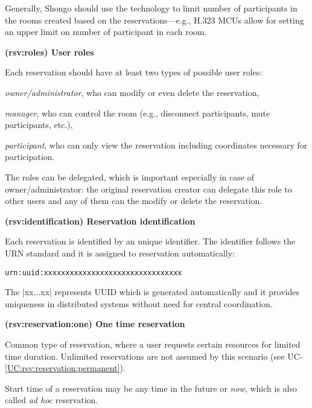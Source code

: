 \documentclass[a4paper]{report}
\makeatletter
\newcounter{UCcounter}
\newenvironment{UseCases}%
	{\begin{list}{\textbf{UC-\arabic{UCcounter}}}{\@nmbrlisttrue\def\@listctr{UCcounter}}}%
	{\end{list}}
\newcommand{\UClabel}[1]{\label{UC:#1}}
\newcommand{\UCref}[1]{UC-\ref{UC:#1}}
\newcommand{\UseCase}[2]{\item\UClabel{#2} \textbf{(#2) #1}\\ \nopagebreak}
\makeatother
\begin{document}
\begin{UseCases}
\begin{compactitem}
\end{compactitem}

Generally, Shongo should use the technology to limit number of participants in
the rooms created based on the reservations---e.g., H.323 MCUs allow for
setting an upper limit on number of participant in each room.

\UseCase{User roles}{rsv:roles}

Each reservation should have at least two types of possible user roles:

\begin{compactitem}

\item \emph{owner/administrator}, who can modify or even delete the reservation,

\item \emph{manager}, who can control the room (e.g., disconnect participants, mute participants, etc.),

\item \emph{participant}, who can only view the reservation including coordinates necessary for participation.

\end{compactitem}

The roles can be delegated, which is important especially in case of owner/administrator: the original reservation creator can delegate this role to other users and any of them can the modify or delete the reservation.


\UseCase{Reservation identification}{rsv:identification}

Each reservation is identified by an unique identifier. The identifier follows the URN standard \cite{rfc2141} and it is assigned to reservation automatically:
\begin{verbatim}
urn:uuid:xxxxxxxxxxxxxxxxxxxxxxxxxxxxxxxx
\end{verbatim}
The |xx...xx| represents UUID \cite{rfc4122} which is generated automatically and it provides uniqueness in distributed systems without need for central coordination.


\UseCase{One time reservation}{rsv:reservation:one}

Common type of reservation, where a user requests certain resources for limited
time duration. Unlimited reservations are not assumed by this scenario (see
\UCref{rsv:reservation:permanent}).

Start time of a reservation may be any time in the future or \emph{now}, which
is also called \emph{ad hoc} reservation.


\end{UseCases}
\end{document}
